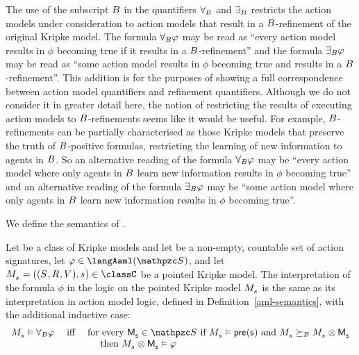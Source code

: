 The use of the subscript $B$ in the quantifiers ${\forall_{B}}$ and ${\exists_{B}}$ restricts the action models under consideration to action models that result in a $B$-refinement of the original Kripke model.
The formula ${\forall_{B}} \varphi$ may be read as ``every action model results in $\phi$ becoming true if it results in a $B$-refinement'' and the formula ${\exists_{B}} \varphi$ may be read as ``some action model results in $\phi$ becoming true and results in a $B$-refinement''.
This addition is for the purposes of showing a full correspondence between action model quantifiers and refinement quantifiers.
Although we do not consider it in greater detail here, the notion of restricting the results of executing action models to $B$-refinements seems like it would be useful.
For example, $B$-refinements can be partially characterised as those Kripke models that preserve the truth of $B$-positive formulas, restricting the learning of new information to agents in $B$.
So an alternative reading of the formula ${\forall_{B}} \varphi$ may be ``every action model where only agents in $B$ learn new information results in $\phi$ becoming true'' and an alternative reading of the formula ${\exists_{B}} \varphi$ may be ``some action model where only agents in $B$ learn new information results in $\phi$ becoming true''.

We define the semantics of \logicAaml{}.

\begin{definition}
Let \classC{} be a class of Kripke models and let \aSignatureFamily{} be a non-empty, countable set of action signatures, let $\phi \in \langAaml(\aSignatureFamily)$, and let $\kPModelAndTuple{\kStateS} \in \classC$ be a pointed Kripke model.
The interpretation of the formula $\phi$ in the logic \logicAamlC{} on the pointed Kripke model $\kPModel{\kStateS}$ is the same as its interpretation in action model logic, defined in Definition~\ref{aml-semantics}, with the additional inductive case:
$$
\begin{array}{lcl}
    \kPModel{\kStateS} \entails \allactsBs \phi & \text{ iff } & \text{for every } \aPModel{\aStateS} \in \aSignatureFamily \text{ if } \kPModel{\kStateS} \entails \aPrecondition(\aStateS) \text{ and } \kPModel{\kStateS} \simulatesBs \kPModel{\kStateS} \exec \aPModel{\aStateS}\\&&\quad \text{ then } \kPModel{\kStateS} \exec \aPModel{\aStateS} \entails \phi
\end{array}
$$
\end{definition}

